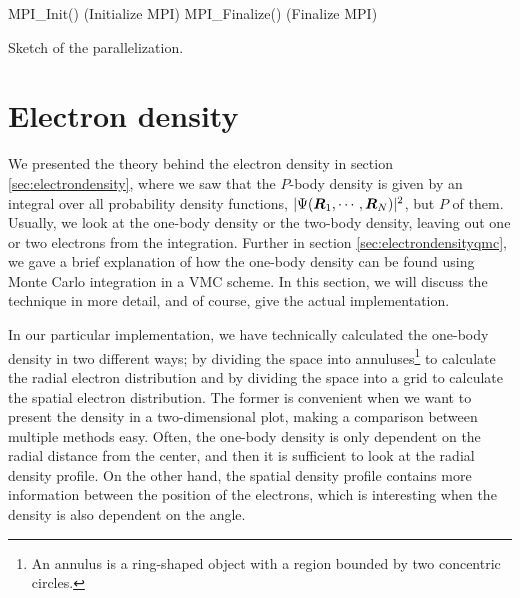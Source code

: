 \IncMargin{1em}
\begin{algorithm}
	\SetAlgoLined
	MPI\_Init() (Initialize MPI)\;
	MPI\_Finalize() (Finalize MPI)\;
	\caption{Sketch of the parallelization.}
	\label{alg:mpi}
\end{algorithm}\DecMargin{1em}

\section{Electron density} \label{sec:electrondensityimplementation}
We presented the theory behind the electron density in section \ref{sec:electrondensity}, where we saw that the $P$-body density is given by an integral over all probability density functions, $|\Psi(\boldsymbol{{R}}_1,\cdots,\boldsymbol{{R}}_N)|^2$, but $P$ of them. Usually, we look at the one-body density or the two-body density, leaving out one or two electrons from the integration. Further in section \ref{sec:electrondensityqmc}, we gave a brief explanation of how the one-body density can be found using Monte Carlo integration in a VMC scheme. In this section, we will discuss the technique in more detail, and of course, give the actual implementation.

In our particular implementation, we have technically calculated the one-body density in two different ways; by dividing the space into annuluses\footnote{An annulus is a ring-shaped object with a region bounded by two concentric circles.} to calculate the radial electron distribution and by dividing the space into a grid to calculate the spatial electron distribution. The former is convenient when we want to present the density in a two-dimensional plot, making a comparison between multiple methods easy. Often, the one-body density is only dependent on the radial distance from the center, and then it is sufficient to look at the radial density profile. On the other hand, the spatial density profile contains more information between the position of the electrons, which is interesting when the density is also dependent on the angle.

